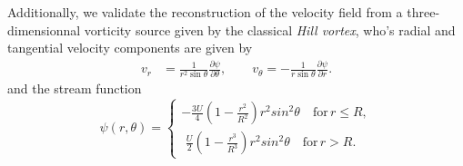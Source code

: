 \documentclass{article}
\begin{document}
Additionally, we validate the reconstruction of the velocity field from a three-dimensionnal vorticity source given by the classical \emph{Hill vortex}, who's radial and tangential velocity components are given by
\begin{align}
    v_r &= \frac{1}{r^2\sin\theta}\frac{\partial\psi}{\partial\theta}, \qquad v_\theta = -\frac{1}{r\sin\theta}\frac{\partial\psi}{\partial r}.
\end{align}
and the stream function 
\begin{equation}
    \psi(r,\theta) = \begin{cases}
    -\frac{3U}{4}\left(1-\frac{r^2}{R^2}\right)r^2sin^2\theta \quad \text{for} \, r \le R,\\
     \,\,\frac{U}{2}\left(1-\frac{r^3}{R^3}\right)r^2sin^2\theta \quad \text{for} \, r > R.
    \end{cases}
\end{equation}
\end{document}
